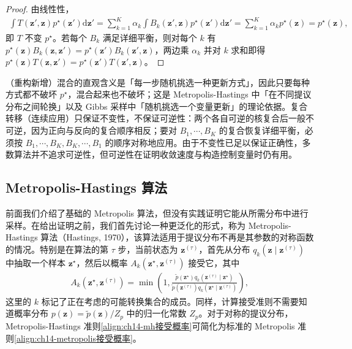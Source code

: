 \documentclass[../../main.tex]{subfiles}
\begin{document}
\begin{proof}
由线性性，
\begin{align*}
\int T\!\left(\bm{z}',\bm{z}\right)p^{\star}\!\left(\bm{z}'\right)\mathrm{d}\bm{z}'=\sum_{k=1}^{K}\alpha_{k}\int B_{k}\!\left(\bm{z}',\bm{z}\right)p^{\star}\!\left(\bm{z}'\right)\mathrm{d}\bm{z}'=\sum_{k=1}^{K}\alpha_{k}p^{\star}(\bm{z})=p^{\star}(\bm{z}),
\end{align*}
即 $T$ 不变 $p^{\star}$。若每个 $B_{k}$ 满足详细平衡，则对每个 $k$ 有 $p^{\star}(\bm{z})B_{k}\!\left(\bm{z},\bm{z}'\right)=p^{\star}\!\left(\bm{z}'\right)B_{k}\!\left(\bm{z}',\bm{z}\right)$，两边乘 $\alpha_{k}$ 并对 $k$ 求和即得 $p^{\star}(\bm{z})T\!\left(\bm{z},\bm{z}'\right)=p^{\star}\!\left(\bm{z}'\right)T\!\left(\bm{z}',\bm{z}\right)$。
\end{proof}

\begin{remark}（重构新增）混合的直观含义是「每一步随机挑选一种更新方式」，因此只要每种方式都不破坏 $p^{\star}$，混合起来也不破坏；这是 Metropolis-Hastings 中「在不同提议分布之间轮换」以及 Gibbs 采样中「随机挑选一个变量更新」的理论依据。复合转移（连续应用）只保证不变性，不保证可逆性：两个各自可逆的核复合后一般不可逆，因为正向与反向的复合顺序相反；要对 $B_{1},\cdots,B_{K}$ 的复合恢复详细平衡，必须按 $B_{1},\cdots,B_{K},B_{K},\cdots,B_{1}$ 的顺序对称地应用。由于不变性已足以保证正确性，多数算法并不追求可逆性，但可逆性在证明收敛速度与构造控制变量时仍有用。
\end{remark}

\subsection{Metropolis-Hastings 算法}\label{subsection:ch14-Metropolis-Hastings}

前面我们介绍了基础的 Metropolis 算法，但没有实践证明它能从所需分布中进行采样。在给出证明之前，我们首先讨论一种更泛化的形式，称为 Metropolis-Hastings 算法（Hastings, 1970），该算法适用于提议分布不再是其参数的对称函数的情况。特别是在算法的第 $\tau$ 步，当前状态为 $\bm{z}^{(\tau)}$，首先从分布 $q_{k}\!\left(\bm{z}\mid\bm{z}^{(\tau)}\right)$ 中抽取一个样本 $\bm{z}^{\star}$，然后以概率 $A_{k}\!\left(\bm{z}^{\star},\bm{z}^{(\tau)}\right)$ 接受它，其中
\begin{align}
A_{k}\!\left(\bm{z}^{\star},\bm{z}^{(\tau)}\right)=\min\left(1,\frac{\widetilde{p}\!\left(\bm{z}^{\star}\right)q_{k}\!\left(\bm{z}^{(\tau)}\mid\bm{z}^{\star}\right)}{\widetilde{p}\!\left(\bm{z}^{(\tau)}\right)q_{k}\!\left(\bm{z}^{\star}\mid\bm{z}^{(\tau)}\right)}\right),
\label{align:ch14-mh接受概率}
\end{align}
这里的 $k$ 标记了正在考虑的可能转换集合的成员。同样，计算接受准则不需要知道概率分布 $p(\bm{z})=\widetilde{p}(\bm{z})/Z_{p}$ 中的归一化常数 $Z_{p}$。对于对称的提议分布，Metropolis-Hastings 准则\eqref{align:ch14-mh接受概率}可简化为标准的 Metropolis 准则\eqref{align:ch14-metropolis接受概率}。
\end{document}
